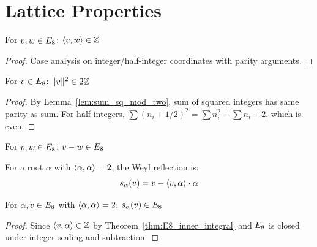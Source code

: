 \section{Lattice Properties}


\begin{theorem}\label{thm:E8_inner_integral}
    \leanok
    For $v, w \in E_8$: $\langle v, w \rangle \in \mathbb{Z}$
\end{theorem}
\begin{proof}
    Case analysis on integer/half-integer coordinates with parity arguments.
\end{proof}

\begin{theorem}\label{thm:E8_norm_sq_even}
    \leanok
    For $v \in E_8$: $\| v \|^2 \in 2\mathbb{Z}$
\end{theorem}
\begin{proof}
    By Lemma~\ref{lem:sum_sq_mod_two}, sum of squared integers has same parity as sum.
    For half-integers, $\sum(n_i + 1/2)^2 = \sum n_i^2 + \sum n_i + 2$, which is even.
\end{proof}

\begin{theorem}\label{thm:E8_sub_closed}
    \leanok
    For $v, w \in E_8$: $v - w \in E_8$
\end{theorem}

\begin{definition}\label{def:E8_reflection}
    \leanok
    For a root $\alpha$ with $\langle \alpha, \alpha \rangle = 2$, the Weyl reflection is:
    \[
        s_\alpha(v) = v - \langle v, \alpha \rangle \cdot \alpha
    \]
\end{definition}

\begin{theorem}\label{thm:reflect_preserves_lattice}
    \leanok
    For $\alpha, v \in E_8$ with $\langle \alpha, \alpha \rangle = 2$:
    $s_\alpha(v) \in E_8$
\end{theorem}
\begin{proof}
    Since $\langle v, \alpha \rangle \in \mathbb{Z}$ by Theorem~\ref{thm:E8_inner_integral} and
    $E_8$ is closed under integer scaling and subtraction.
\end{proof}

